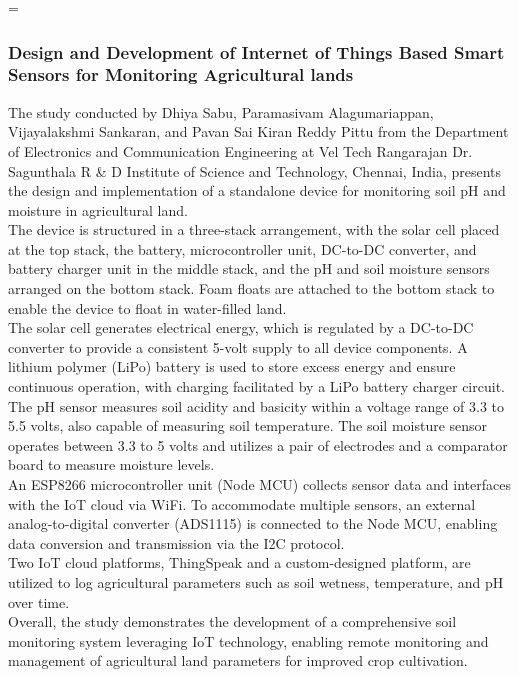 =\documentclass[12pt, a4paper]{article}
\begin{document}
\subsubsection{Design and Development of Internet of Things Based Smart Sensors for Monitoring Agricultural lands}
The study conducted by Dhiya Sabu, Paramasivam Alagumariappan, Vijayalakshmi Sankaran, and Pavan Sai Kiran Reddy Pittu  \cite{sabu2023design} from the Department of Electronics and Communication Engineering at Vel Tech Rangarajan Dr. Sagunthala R & D Institute of Science and Technology, Chennai, India, presents the design and implementation of a standalone device for monitoring soil pH and moisture in agricultural land.\\
The device is structured in a three-stack arrangement, with the solar cell placed at the top stack, the battery, microcontroller unit, DC-to-DC converter, and battery charger unit in the middle stack, and the pH and soil moisture sensors arranged on the bottom stack. Foam floats are attached to the bottom stack to enable the device to float in water-filled land.\\
The solar cell generates electrical energy, which is regulated by a DC-to-DC converter to provide a consistent 5-volt supply to all device components. A lithium polymer (LiPo) battery is used to store excess energy and ensure continuous operation, with charging facilitated by a LiPo battery charger circuit.\\
The pH sensor measures soil acidity and basicity within a voltage range of 3.3 to 5.5 volts, also capable of measuring soil temperature. The soil moisture sensor operates between 3.3 to 5 volts and utilizes a pair of electrodes and a comparator board to measure moisture levels.\\
An ESP8266 microcontroller unit (Node MCU) collects sensor data and interfaces with the IoT cloud via WiFi. To accommodate multiple sensors, an external analog-to-digital converter (ADS1115) is connected to the Node MCU, enabling data conversion and transmission via the I2C protocol.\\
Two IoT cloud platforms, ThingSpeak and a custom-designed platform, are utilized to log agricultural parameters such as soil wetness, temperature, and pH over time.\\
Overall, the study demonstrates the development of a comprehensive soil monitoring system leveraging IoT technology, enabling remote monitoring and management of agricultural land parameters for improved crop cultivation.
\end{document}
